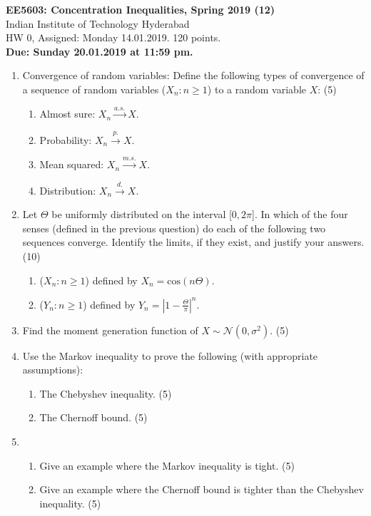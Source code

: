 \documentclass{article}
\begin{document}
\begin{center}
{\large{{\bf{EE5603: Concentration Inequalities, Spring 2019 (12)}\\}}}
Indian Institute of Technology Hyderabad\\
HW 0, Assigned: Monday 14.01.2019. 120 points.\\
{\bf{Due: Sunday 20.01.2019 at 11:59 pm.}} 
\end{center}
\begin{enumerate}
\item{{{Convergence of random variables:}} Define the following types of convergence of a sequence of random variables ($X_n: n\geq 1$) to a random variable $X$: (5)
\begin{enumerate}
\item{Almost sure: $X_n \xrightarrow {a.s.} X$.}
\item{Probability: $X_n \xrightarrow {p.} X$.}
\item{Mean squared: $X_n \xrightarrow {m.s.} X$.}
\item{Distribution: $X_n \xrightarrow {d.} X$.}
\end{enumerate}
}
\item{Let $\Theta$ be uniformly distributed on the interval [$0, 2\pi$]. In which of the four senses (defined in the previous question) do each of the following two sequences converge. Identify the limits, if they exist, and justify your answers. (10)
\begin{enumerate}
\item{($X_n: n\geq 1$) defined by $X_n = \text{cos}(n\Theta)$.}
\item{($Y_n: n\geq 1$) defined by $Y_n = |1 - \frac{\Theta}{\pi}|^n$.}
\end{enumerate}
}
\item{Find the moment generation function of $X \sim \mathcal{N}(0, \sigma^2)$. (5)}
\item{Use the Markov inequality to prove the following (with appropriate assumptions):
\begin{enumerate}
\item{The Chebyshev inequality. (5)}
\item{The Chernoff bound. (5)}
\end{enumerate}
}
\item{\begin{enumerate}
\item{Give an example where the Markov inequality is tight. (5)}
\item{Give an example where the Chernoff bound is tighter than the Chebyshev inequality. (5)}

\end{enumerate}}
\end{enumerate}
\end{document}
